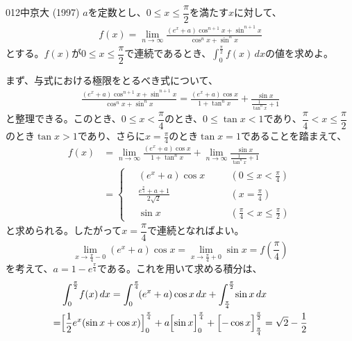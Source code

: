 \begin{prob}{012}{}{中京大 (1997)}
 $a$を定数とし、$0\le x \le \dfrac{\pi}{2}$を満たす$x$に対して、
 \begin{align*}
  f(x)=\lim_{n\rightarrow\infty}\frac{(e^x+a)\cos^{n+1}x+\sin^{n+1}x}{\cos^nx+\sin^nx}
 \end{align*}
 とする。$f(x)$が$0\le x \le \dfrac{\pi}{2}$で連続であるとき、$\displaystyle \int^{\frac{\pi}{2}}_0\!\! f(x) \,dx$の値を求めよ。
\end{prob}
まず、与式における極限をとるべき式について、
\begin{align*}
 \frac{(e^x+a)\cos^{n+1}x+\sin^{n+1}x}{\cos^nx+\sin^nx}=\frac{(e^x+a)\cos x}{1+\tan^n x}+\frac{\sin x}{\frac{1}{\tan^n x}+1}
\end{align*}
と整理できる。このとき、$0\le x<\dfrac{\pi}{4}$のとき、$0\le\tan x<1$であり、$\dfrac{\pi}{4}<x\le\dfrac{\pi}{2}$のとき$\tan x>1$であり、さらに$x=\frac{\pi}{4}$のとき$\tan x=1$であることを踏まえて、
\begin{align*}
 f(x)&=\lim_{n\to\infty} \frac{(e^x+a)\cos x}{1+\tan^n x}+ \lim_{n\to\infty} \frac{\sin x}{\frac{1}{\tan^n x}+1} \\
 &=\left\{\,
 \begin{alignedat}{2}
  &(e^x+a)\cos x & &\left(0\le x<\frac{\pi}{4}\right) \\
  &\frac{e^\frac{\pi}{4}+a+1}{2\sqrt{2}} & \quad &\left(x=\frac{\pi}{4}\right) \\
  &\sin x & &\left(\frac{\pi}{4}<x\le\frac{\pi}{2}\right)
 \end{alignedat} \right.
\end{align*}
と求められる。したがって$x=\dfrac{\pi}{4}$で連続となればよい。
\[ \lim_{x\to\frac{\pi}{4}-0} (e^x+a)\cos x = \lim_{x\to\frac{\pi}{4}+0} \sin x = f\left(\frac{\pi}{4}\right) \]
を考えて、$a=1-e^\frac{\pi}{4}$である。これを用いて求める積分は、
\begin{align*}
 &\int_0^{\frac{\pi}{2}}\! f(x) \,dx = \int_0^{\frac{\pi}{4}}\! (e^x+a)\cos x \,dx + \int_{\frac{\pi}{4}}^{\frac{\pi}{2}}\! \sin x \,dx \\
 =& \Bigl[\frac{1}{2}e^x(\sin x+\cos x)\Bigr]_0^{\frac{\pi}{4}}+a\Bigl[\sin x \Bigr]_0^{\frac{\pi}{4}}+\Bigl[-\cos x\Bigr]_{\frac{\pi}{4}}^{\frac{\pi}{2}} = \sqrt{2}-\frac{1}{2}
\end{align*}



